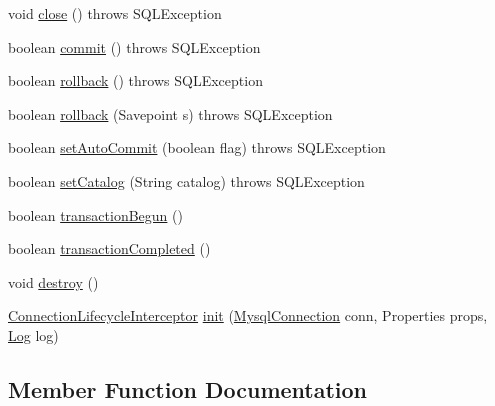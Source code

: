 \begin{DoxyCompactItemize}
\item 
void \mbox{\hyperlink{classtestsuite_1_1simple_1_1_test_lifecycle_interceptor_ace03032cbe6f9aae94a05ae442466d2d}{close}} ()  throws S\+Q\+L\+Exception 
\item 
boolean \mbox{\hyperlink{classtestsuite_1_1simple_1_1_test_lifecycle_interceptor_a1c51358948a855403a8953f3d4ba5590}{commit}} ()  throws S\+Q\+L\+Exception 
\item 
boolean \mbox{\hyperlink{classtestsuite_1_1simple_1_1_test_lifecycle_interceptor_a7cdeb42f7891e22dadce89627befbcdf}{rollback}} ()  throws S\+Q\+L\+Exception 
\item 
boolean \mbox{\hyperlink{classtestsuite_1_1simple_1_1_test_lifecycle_interceptor_a75e431938104c0c3b8e1913b81ced992}{rollback}} (Savepoint s)  throws S\+Q\+L\+Exception 
\item 
boolean \mbox{\hyperlink{classtestsuite_1_1simple_1_1_test_lifecycle_interceptor_a98376ea207527feed3bc76d491c98cc2}{set\+Auto\+Commit}} (boolean flag)  throws S\+Q\+L\+Exception 
\item 
boolean \mbox{\hyperlink{classtestsuite_1_1simple_1_1_test_lifecycle_interceptor_accae42bd1b1d7a51fa35a6f375bf4ce4}{set\+Catalog}} (String catalog)  throws S\+Q\+L\+Exception 
\item 
boolean \mbox{\hyperlink{classtestsuite_1_1simple_1_1_test_lifecycle_interceptor_a5ca18da030f4569891254990898f9c1b}{transaction\+Begun}} ()
\item 
boolean \mbox{\hyperlink{classtestsuite_1_1simple_1_1_test_lifecycle_interceptor_a00973c1a52ebc81176be2b9a46f5aa66}{transaction\+Completed}} ()
\item 
void \mbox{\hyperlink{classtestsuite_1_1simple_1_1_test_lifecycle_interceptor_a2a1a99507005bb6d901d3782880aac09}{destroy}} ()
\item 
\mbox{\hyperlink{interfacecom_1_1mysql_1_1cj_1_1jdbc_1_1interceptors_1_1_connection_lifecycle_interceptor}{Connection\+Lifecycle\+Interceptor}} \mbox{\hyperlink{classtestsuite_1_1simple_1_1_test_lifecycle_interceptor_ab7683af2eebc778cbf803ebc873c95ac}{init}} (\mbox{\hyperlink{interfacecom_1_1mysql_1_1cj_1_1_mysql_connection}{Mysql\+Connection}} conn, Properties props, \mbox{\hyperlink{interfacecom_1_1mysql_1_1cj_1_1log_1_1_log}{Log}} log)
\end{DoxyCompactItemize}


\subsection{Member Function Documentation}
\mbox{\label{classtestsuite_1_1simple_1_1_test_lifecycle_interceptor_ace03032cbe6f9aae94a05ae442466d2d}} 
